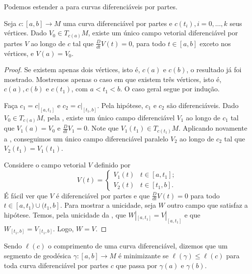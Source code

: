 Podemos estender a  para curvas diferenciáveis por partes.
\begin{proposition}
    \label{prop:transporte-paralelo-por-partes}
    Seja $c:[a,b]\to M$ uma curva diferenciável por partes e $c(t_{i}), i=0, \dots, k$ seus vértices.
    Dado $V_{0} \in T_{c(a)}M$, existe um único campo vetorial diferenciável por partes $V$ ao longo de $c$ tal que $\frac{D}{dt}V(t)=0$, para todo $t \in [a,b]$ exceto nos vértices, e $V(a)=V_{0}$.
    \begin{proof}

        Se existem apenas dois vértices, isto é, $c(a)$ e $c(b)$, o resultado já foi mostrado. Mostremos apenas o caso em que existem três vértices, isto é, $c(a), c(b)$ e $c(t_{1})$, com $a<t_{1}<b$. O caso geral segue por indução.

        Faça $c_{1}=c|_{[a,t_{1}]}$ e $c_{2}=c|_{[t_{1},b]}$. Pela hipótese, $c_{1}$ e $c_{2}$ são diferenciáveis.
        Dado $V_{0} \in T_{c(a)}M$, pela , existe um único campo diferenciável $V_{1}$ ao longo de $c_{1}$ tal que $V_{1}(a)=V_{0}$ e $\frac{D}{dt}V_{1}=0$. Note que $V_{1}(t_{1})\in T_{c(t_{1})}M$.
        Aplicando novamente a , conseguimos um único campo diferenciável paralelo $V_{2}$
        ao longo de $c_{2}$ tal que $V_{2}(t_{1})=V_{1}(t_{1})$.

        Considere o campo vetorial $V$ definido por
        \begin{equation*}
            V(t)=\begin{cases}
                V_{1}(t) & t \in[a,t_{1}];  \\
                V_{2}(t) & t \in [t_{1},b].
            \end{cases}
        \end{equation*}
        É fácil ver que $V$ é diferenciável por partes e que $\frac{D}{dt}V(t)=0$ para todo $t \in [a,t_{1}) \cup (t_{1}, b]$.
        Para mostrar a unicidade, seja $W$ outro campo que satisfaz a hipótese. Temos, pela unicidade da , que $W|_{[a,t_{1}]}=V|_{[a,t_{1}]}$ e que $W_{[t_{1},b]}=V_{[t_{1},b]}$. Logo, $W=V$.
    \end{proof}
\end{proposition}
\begin{definition}
    \label{def:segmento-minimizante}
    Sendo $\ell(c)$ o comprimento de uma curva diferenciável, dizemos que um segmento de geodésica $\gamma:[a,b]\to M$ é minimizante se $\ell(\gamma)\leq \ell(c)$ para toda curva diferenciável por partes $c$ que passa por $\gamma(a)$ e $\gamma(b)$.
\end{definition}
